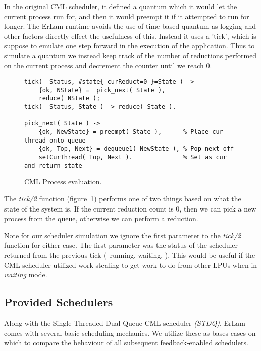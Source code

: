 In the original CML scheduler, it defined a quantum which it would let the 
current process run for, and then it would preempt it if it attempted to run 
for longer. The ErLam runtime avoids the use of time based quantum as logging 
and other factors directly effect the usefulness of this. Instead it uses a 
'tick', which is suppose to emulate one
step forward in the execution of the application. Thus to simulate a quantum we
instead keep track of the number of reductions performed on the current process
and decrement the counter until we reach 0.

\begin{figure}
\begin{verbatim}
tick( _Status, #state{ curReduct=0 }=State ) ->
    {ok, NState} =  pick_next( State ),
    reduce( NState );
tick( _Status, State ) -> reduce( State ).

pick_next( State ) ->
    {ok, NewState} = preempt( State ),      % Place cur thread onto queue
    {ok, Top, Next} = dequeue1( NewState ), % Pop next off
    setCurThread( Top, Next ).              % Set as cur and return state
\end{verbatim}
\caption{CML Process evaluation.}
\label{fig:cml-tick}
\end{figure}

The \emph{tick/2} function (figure~\ref{fig:cml-tick}) performs one of two 
things based on what the state of the system is. If the current reduction count 
is $0$, then we can pick a new process from the queue, otherwise we can perform
a reduction. 

Note for our scheduler simulation we ignore the first parameter to the 
\emph{tick/2} function for either case. The first parameter was the status of 
the scheduler returned from the previous tick (\eg~running, waiting, \etc). This 
would be useful if the CML scheduler utilized work-stealing to get work to do
from other LPUs when in \emph{waiting} mode.

\subsection{Provided Schedulers}

Along with the Single-Threaded Dual Queue CML scheduler {\sl (STDQ)}, ErLam 
comes with several basic scheduling mechanics. We utilize these as bases cases 
on which to compare the behaviour of all subsequent feedback-enabled schedulers.

